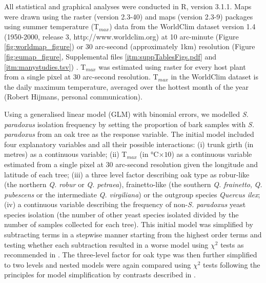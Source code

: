 \documentclass[12pt]{article}
\begin{document}
\begin{linenumbers}
All statistical and graphical analyses were conducted in R, version 3.1.1. Maps were drawn using the raster (version 2.3-40) and maps (version 2.3-9) packages using summer temperature (T$_{max}$) data from the WorldClim dataset version 1.4 (1950-2000, release 3, http://www.worldclim.org) at 10 arc-minute (Figure \ref{fig:worldmap_figure}) or 30 arc-second (approximately 1km) resolution (Figure \ref{fig:eumap_figure}, Supplemental files \ref{itm:suppTablesFigs.pdf} and \ref{itm:manystudies.tsv}) \citep{hijmans_very_2005}. T$_{max}$ was estimated using raster for every host plant from a single pixel at 30 arc-second resolution. T$_{max}$ in the WorldClim dataset is the daily maximum temperature, averaged over the hottest month of the year (Robert Hijmans, personal communication).

Using a generalised linear model (GLM) with binomial errors, we modelled \textit{S. paradoxus} isolation frequency by setting the proportion of bark samples with \textit{S. paradoxus} from an oak tree as the response variable. The initial model included four explanatory variables and all their possible interactions: (i) trunk girth (in metres) as a continuous variable; (ii) T$_{max}$ (in \si{\degreeCelsius}$\times10$) as a continuous variable estimated from a single pixel at 30 arc-second resolution given the longitude and latitude of each tree; (iii) a three level factor describing oak type as robur-like (the northern \textit{Q. robur} or \textit{Q. petraea}), frainetto-like (the southern \textit{Q. frainetto}, \textit{Q. pubescens} or the intermediate \textit{Q. virgiliana}) or the outgroup species \textit{Quercus ilex}; (iv) a continuous variable describing the frequency of non-\textit{S. paradoxus} yeast species isolation (the number of other yeast species isolated divided by the number of samples collected for each tree). This initial model was simplified by subtracting terms in a stepwise manner starting from the highest order terms and testing whether each subtraction resulted in a worse model using $\chi^2$ tests as recommended in \citet{crawley_statistics:_2005}. The three-level factor for oak type was then further simplified to two levels and nested models were again compared using $\chi^2$ tests following the principles for model simplification by contrasts described in \citet{crawley_statistics:_2005}.


\end{linenumbers}
\end{document}
